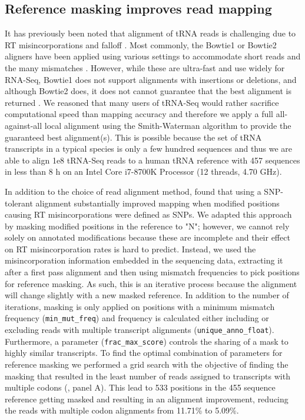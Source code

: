 \documentclass[9pt,lineno]{elife}
\begin{document}
 

\subsection{Reference masking improves read mapping}
It has previously been noted that alignment of tRNA reads is challenging due to RT misincorporations and falloff \citep{Hoffmann2018-uz, Behrens2021-gb}.
Most commonly, the Bowtie1 or Bowtie2 aligners have been applied using various settings to accommodate short reads and the many mismatches \citep{Cozen2015-cx, Zheng2015-kj, Clark2016-ph, Evans2017-st, Pinkard2020-yd}.
However, while these are ultra-fast and use widely for RNA-Seq, Bowtie1 does not support alignments with insertions or deletions, and although Bowtie2 does, it does not cannot guarantee that the best alignment is returned \citep{Langmead2009-yx, Langmead2012-ui}.
We reasoned that many users of tRNA-Seq would rather sacrifice computational speed than mapping accuracy and therefore we apply a full all-against-all local alignment using the Smith-Waterman algorithm to provide the guaranteed best alignment(s).
This is possible because the set of tRNA transcripts in a typical species is only a few hundred sequences and thus we are able to align 1e8 tRNA-Seq reads to a human tRNA reference with 457 sequences in less than 8 h on an Intel Core i7-8700K Processor (12 threads, 4.70 GHz).

In addition to the choice of read alignment method, \cite{Behrens2021-gb} found that using a SNP-tolerant alignment substantially improved mapping when modified positions causing RT misincorporations were defined as SNPs.
We adapted this approach by masking modified positions in the reference to "N"; however, we cannot rely solely on annotated modifications because these are incomplete and their effect on RT misincorporation rates is hard to predict.
Instead, we used the misincorporation information embedded in the sequencing data, extracting it after a first pass alignment and then using mismatch frequencies to pick positions for reference masking.
As such, this is an iterative process because the alignment will change slightly with a new masked reference.
In addition to the number of iterations, masking is only applied on positions with a minimum mismatch frequency (\verb|min_mut_freq|) and frequency is calculated either including or excluding reads with multiple transcript alignments (\verb|unique_anno_float|).
Furthermore, a parameter (\verb|frac_max_score|) controls the sharing of a mask to  highly similar transcripts.
To find the optimal combination of parameters for reference masking we performed a grid search with the objective of finding the masking that resulted in the least number of reads assigned to transcripts with multiple codons (, panel A).
This lead to 533 positions in the 455 sequence reference getting masked and resulting in an alignment improvement, reducing the reads with multiple codon alignments from 11.71\% to 5.09\%.
\end{document}
